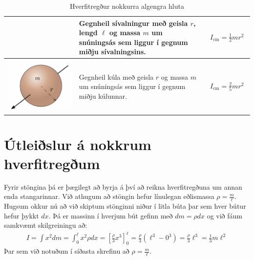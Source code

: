 \begin{table}[h!]
\begin{tabular}{ | c | m{5cm} | m{5cm} | }
\begin{minipage}{.3\textwidth}
      \vspace{0.3cm}
    \end{minipage}
    &
      Gegnheil sívalningur með geisla $r$, lengd $\ell$ og massa $m$ um snúningsás sem liggur í gegnum miðju sívalningsins.
    & 
      \begin{align*}
          I_{\text{cm}} = \frac{1}{2}mr^2
      \end{align*}
    \\ \hline
                \begin{minipage}{.3\textwidth}
        \vspace{0.3cm}
    \centering
      \includegraphics[width=0.75\linewidth]{momentsOfInertia/gkula.pdf}
      \vspace{0.3cm}
    \end{minipage}
    &
      Gegnheil kúla með geisla $r$ og massa $m$ um snúningsás sem liggur í gegnum miðju kúlunnar.
    & 
      \begin{align*}
          I_{\text{cm}} = \frac{2}{5}mr^2
      \end{align*}
    \\ \hline
    
    
  \end{tabular}
  \caption{Hverfitregður nokkurra algengra hluta} \label{table:hverfi}
\end{table}


\section{Útleiðslur á nokkrum hverfitregðum}

Fyrir stöngina þá er þægilegt að byrja á því að reikna hverfitregðuna um annan enda stangarinnar. Við athugum að stöngin hefur línulegan eðlismassa $\rho = \frac{m}{\ell}$. Hugsum okkur nú að við skiptum stönginni niður í litla búta þar sem hver bútur hefur þykkt $dx$. Þá er massinn í hverjum bút gefinn með $dm = \rho dx$ og við fáum samkvæmt skilgreiningu að:
\begin{align*}
    I = \int x^2dm = \int_{0}^{\ell}  x^2 \rho dx =  \left[ \frac{\rho}{3}x^3 \right]_{0}^{\ell} = \frac{\rho}{3}\left( \ell^3 - 0^3 \right) = \frac{\rho}{3}\ell^3 = \frac{1}{3}m\ell^2
\end{align*}
Þar sem við notuðum í síðasta skrefinu að $\rho = \frac{m}{\ell}$.

